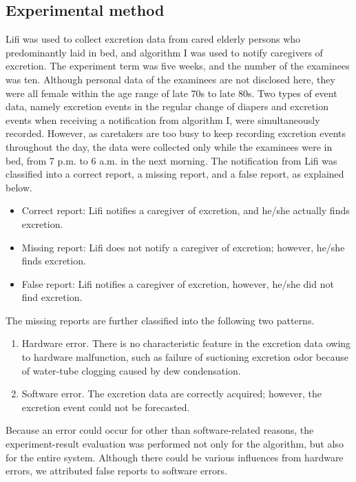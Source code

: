\documentclass[publish,JRM,paper]{jaciiiarticle}
\begin{document}
\subsection{Experimental method}
Lifi was used to collect excretion data from cared elderly persons who predominantly laid in bed, and algorithm I was used to notify caregivers of excretion. The experiment term was five weeks, and the number of the examinees was ten. Although personal data of the examinees are not disclosed here, they were all female within the age range of late 70s to late 80s. Two types of event data, namely excretion events in the regular change of diapers and excretion events when receiving a notification from algorithm I, were simultaneously recorded. However, as caretakers are too busy to keep recording excretion events throughout the day, the data were collected only while the examinees were in bed, from 7 p.m. to 6 a.m. in the next morning. The notification from Lifi was classified into a correct report, a missing report, and a false report, as explained below.

\begin{itemize}
    \item Correct report: Lifi notifies a caregiver of excretion, and he/she actually finds excretion.
    \item Missing report: Lifi does not notify a caregiver of excretion; however, he/she finds excretion.
    \item False report: Lifi notifies a caregiver of excretion, however, he/she did not find excretion.
\end{itemize}
The missing reports are further classified into the following two patterns.
\begin{enumerate}
    \item Hardware error. There is no characteristic feature in the excretion data owing to hardware malfunction, such as failure of suctioning excretion odor because of water-tube clogging caused by dew condensation.
    \item Software error. The excretion data are correctly acquired; however, the excretion event could not be forecasted.

\end{enumerate}
Because an error could occur for other than software-related reasons, the experiment-result evaluation was performed not only for the algorithm, but also for the entire system. Although there could be various influences from hardware errors, we attributed false reports to software errors.
\end{document}
